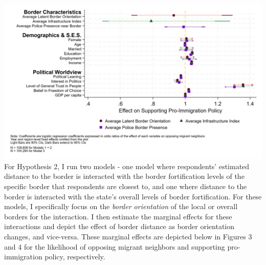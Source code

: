\documentclass[12pt,]{article}
\begin{document}
\includegraphics{figures/border_orientation_policy_figure1.png} For
Hypothesis 2, I run two models - one model where respondents' estimated
distance to the border is interacted with the border fortification
levels of the specific border that respondents are closest to, and one
where distance to the border is interacted with the state's overall
levels of border fortification. For these models, I specifically focus
on the \emph{border orientation} of the local or overall borders for the
interaction. I then estimate the marginal effects for these interactions
and depict the effect of border distance as border orientation changes,
and vice-versa. These marginal effects are depicted below in Figures 3
and 4 for the likelihood of opposing migrant neighbors and supporting
pro-immigration policy, respectively.
\end{document}
